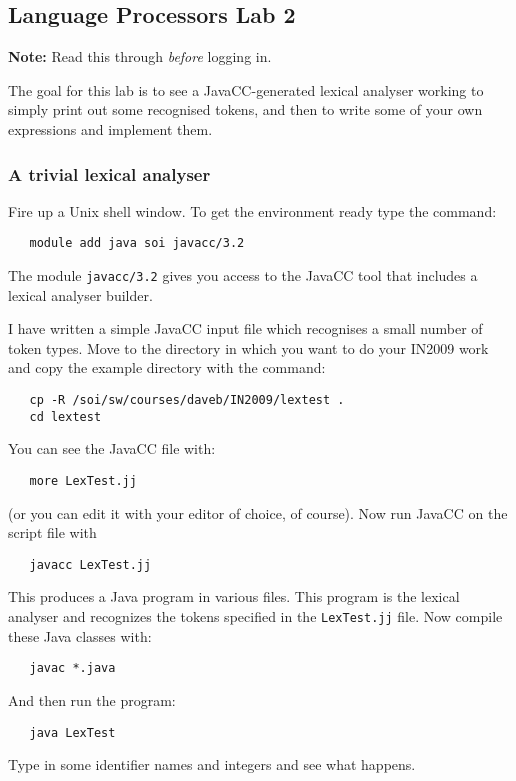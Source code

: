 \documentclass{article}
\begin{document}
\thispagestyle{empty}

\subsection*{Language Processors Lab 2}

{\bf Note:} Read this through {\em before\/} logging in.

\medskip\noindent The goal for this
lab is to see a JavaCC-generated lexical analyser working to
simply print out some recognised tokens, and
then to write some of your own expressions and implement them.

\subsubsection*{A trivial lexical analyser}

Fire up a Unix shell window. 
To get the environment ready type the command:
\begin{verbatim}
   module add java soi javacc/3.2
\end{verbatim}
The module \verb+javacc/3.2+ gives you access to the JavaCC tool that includes
a lexical analyser builder.

I have written a simple JavaCC input file which recognises a small number of
token types.  Move to the directory in which you want to do
your IN2009 work and copy the example directory with the command:
\begin{verbatim}
   cp -R /soi/sw/courses/daveb/IN2009/lextest .
   cd lextest
\end{verbatim}
You can see the JavaCC file with:
\begin{verbatim}
   more LexTest.jj
\end{verbatim}
(or you can edit it with your editor of choice, of course).
Now run JavaCC on the script file with
\begin{verbatim}
   javacc LexTest.jj
\end{verbatim}
This produces a Java program in various files.
This program is the lexical analyser and recognizes the
tokens specified in the \verb+LexTest.jj+ file.
Now compile these Java classes with:
\begin{verbatim}
   javac *.java
\end{verbatim}
And then run the program: 
\begin{verbatim}
   java LexTest
\end{verbatim}
Type in some identifier names and integers and see
what happens.
\end{document}
